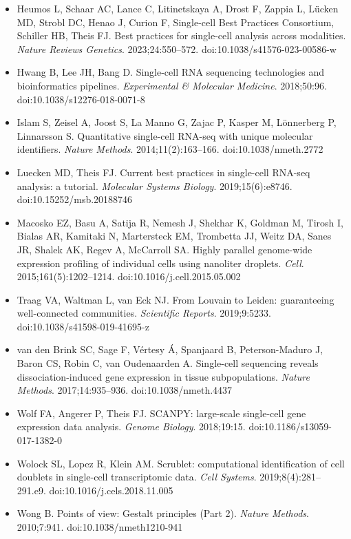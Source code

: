 \begin{itemize}\sloppy
\item Heumos L, Schaar AC, Lance C, Litinetskaya A, Drost F, Zappia L, Lücken MD, Strobl DC, Henao J, Curion F, Single-cell Best Practices Consortium, Schiller HB, Theis FJ. Best practices for single-cell analysis across modalities. \textit{Nature Reviews Genetics}. 2023;24:550--572. doi:10.1038/s41576-023-00586-w
\item Hwang B, Lee JH, Bang D. Single-cell RNA sequencing technologies and bioinformatics pipelines. \textit{Experimental \& Molecular Medicine}. 2018;50:96. doi:10.1038/s12276-018-0071-8
\item Islam S, Zeisel A, Joost S, La Manno G, Zajac P, Kasper M, Lönnerberg P, Linnarsson S. Quantitative single-cell RNA-seq with unique molecular identifiers. \textit{Nature Methods}. 2014;11(2):163--166. doi:10.1038/nmeth.2772
\item Luecken MD, Theis FJ. Current best practices in single-cell RNA-seq analysis: a tutorial. \textit{Molecular Systems Biology}. 2019;15(6):e8746. doi:10.15252/msb.20188746
\item Macosko EZ, Basu A, Satija R, Nemesh J, Shekhar K, Goldman M, Tirosh I, Bialas AR, Kamitaki N, Martersteck EM, Trombetta JJ, Weitz DA, Sanes JR, Shalek AK, Regev A, McCarroll SA. Highly parallel genome-wide expression profiling of individual cells using nanoliter droplets. \textit{Cell}. 2015;161(5):1202--1214. doi:10.1016/j.cell.2015.05.002
\item Traag VA, Waltman L, van Eck NJ. From Louvain to Leiden: guaranteeing well-connected communities. \textit{Scientific Reports}. 2019;9:5233. doi:10.1038/s41598-019-41695-z
\item van den Brink SC, Sage F, Vértesy Á, Spanjaard B, Peterson-Maduro J, Baron CS, Robin C, van Oudenaarden A. Single-cell sequencing reveals dissociation-induced gene expression in tissue subpopulations. \textit{Nature Methods}. 2017;14:935--936. doi:10.1038/nmeth.4437
\item Wolf FA, Angerer P, Theis FJ. SCANPY: large-scale single-cell gene expression data analysis. \textit{Genome Biology}. 2018;19:15. doi:10.1186/s13059-017-1382-0
\item Wolock SL, Lopez R, Klein AM. Scrublet: computational identification of cell doublets in single-cell transcriptomic data. \textit{Cell Systems}. 2019;8(4):281--291.e9. doi:10.1016/j.cels.2018.11.005
\item Wong B. Points of view: Gestalt principles (Part 2). \textit{Nature Methods}. 2010;7:941. doi:10.1038/nmeth1210-941

\end{itemize}
